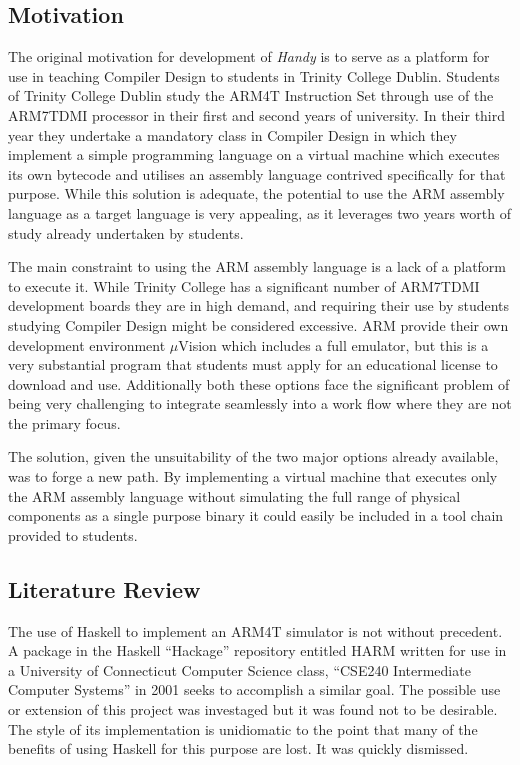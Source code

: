 
\subsection{Motivation}

The original motivation for development of \emph{Handy} is to serve as a platform for use in teaching Compiler Design to students in Trinity College Dublin. Students of Trinity College Dublin study the ARM4T Instruction Set through use of the ARM7TDMI processor in their first and second years of university. In their third year they undertake a mandatory class in Compiler Design in which they implement a simple programming language on a virtual machine which executes its own bytecode and utilises an assembly language contrived specifically for that purpose. While this solution is adequate, the potential to use the ARM assembly language as a target language is very appealing, as it leverages two years worth of study already undertaken by students.

The main constraint to using the ARM assembly language is a lack of a platform to execute it. While Trinity College has a significant number of ARM7TDMI development boards they are in high demand, and requiring their use by students studying Compiler Design might be considered excessive. ARM provide their own development environment $\mu$Vision which includes a full emulator, but this is a very substantial program that students must apply for an educational license to download and use. Additionally both these options face the significant problem of being very challenging to integrate seamlessly into a work flow where they are not the primary focus.

The solution, given the unsuitability of the two major options already available, was to forge a new path. By implementing a virtual machine that executes only the ARM assembly language without simulating the full range of physical components as a single purpose binary it could easily be included in a tool chain provided to students.


\subsection{Literature Review}

The use of Haskell to implement an ARM4T simulator is not without precedent. A package in the Haskell ``Hackage'' repository entitled HARM written for use in a University of Connecticut Computer Science class, ``CSE240 Intermediate Computer Systems'' in 2001 seeks to accomplish a similar goal. The possible use or extension of this project was investaged but it was found not to be desirable. The style of its implementation is unidiomatic to the point that many of the benefits of using Haskell for this purpose are lost. It was quickly dismissed.

